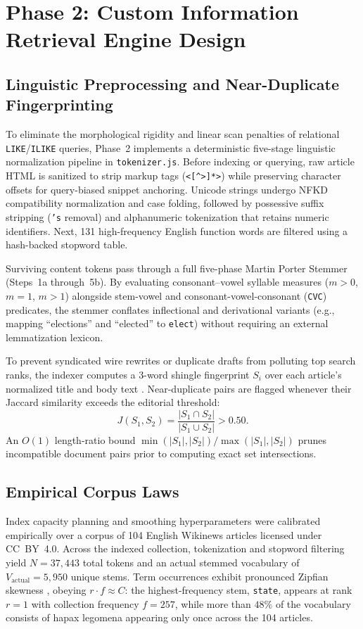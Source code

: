 \section{Phase 2: Custom Information Retrieval Engine Design}

\subsection{Linguistic Preprocessing and Near-Duplicate Fingerprinting}
To eliminate the morphological rigidity and linear scan penalties of relational \texttt{LIKE}/\texttt{ILIKE} queries, Phase~2 implements a deterministic five-stage linguistic normalization pipeline in \texttt{tokenizer.js}. Before indexing or querying, raw article HTML is sanitized to strip markup tags (\texttt{<[^>]*>}) while preserving character offsets for query-biased snippet anchoring. Unicode strings undergo NFKD compatibility normalization and case folding, followed by possessive suffix stripping (\texttt{'s} removal) and alphanumeric tokenization that retains numeric identifiers. Next, 131 high-frequency English function words are filtered using a hash-backed stopword table.

Surviving content tokens pass through a full five-phase Martin Porter Stemmer \cite{b5} (Steps~1a through~5b). By evaluating consonant--vowel syllable measures ($m > 0$, $m = 1$, $m > 1$) alongside stem-vowel and consonant-vowel-consonant (\texttt{CVC}) predicates, the stemmer conflates inflectional and derivational variants (e.g., mapping ``elections'' and ``elected'' to \texttt{elect}) without requiring an external lemmatization lexicon.

To prevent syndicated wire rewrites or duplicate drafts from polluting top search ranks, the indexer computes a 3-word shingle fingerprint $S_i$ over each article's normalized title and body text \cite{b6}. Near-duplicate pairs are flagged whenever their Jaccard similarity exceeds the editorial threshold:
\begin{equation}
J(S_1, S_2) = \frac{|S_1 \cap S_2|}{|S_1 \cup S_2|} > 0.50.
\label{eq:jaccard}
\end{equation}
An $O(1)$ length-ratio bound $\min(|S_1|,|S_2|)/\max(|S_1|,|S_2|)$ prunes incompatible document pairs prior to computing exact set intersections.

\subsection{Empirical Corpus Laws}
Index capacity planning and smoothing hyperparameters were calibrated empirically over a corpus of 104 English Wikinews articles licensed under CC~BY~4.0. Across the indexed collection, tokenization and stopword filtering yield $N = 37{,}443$ total tokens and an actual stemmed vocabulary of $V_{\text{actual}} = 5{,}950$ unique stems. Term occurrences exhibit pronounced Zipfian skewness \cite{b7}, obeying $r \cdot f \approx C$: the highest-frequency stem, \texttt{state}, appears at rank $r = 1$ with collection frequency $f = 257$, while more than $48\%$ of the vocabulary consists of hapax legomena appearing only once across the 104 articles.

